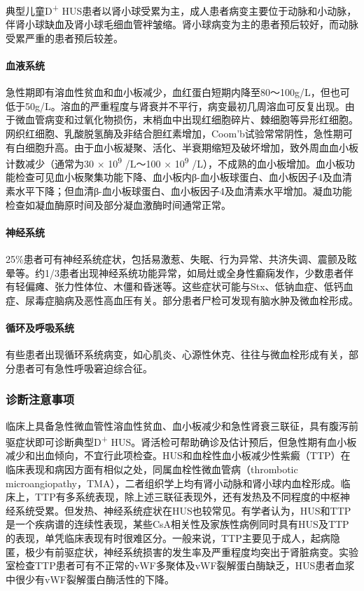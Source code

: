 典型儿童D\textsuperscript{+}
HUS患者以肾小球受累为主，成人患者病变主要位于动脉和小动脉，伴肾小球缺血及肾小球毛细血管袢皱缩。肾小球病变为主的患者预后较好，而动脉受累严重的患者预后较差。

\paragraph{血液系统}

急性期即有溶血性贫血和血小板减少，血红蛋白短期内降至80～100g/L，但也可低于50g/L。溶血的严重程度与肾衰并不平行，病变最初几周溶血可反复出现。由于微血管病变和过氧化物损伤，末梢血中出现红细胞碎片、棘细胞等异形红细胞。网织红细胞、乳酸脱氢酶及非结合胆红素增加，Coom'b试验常常阴性，急性期可有白细胞升高。由于血小板凝聚、活化、半衰期缩短及破坏增加，致外周血血小板计数减少（通常为30
× 10\textsuperscript{9} /L～100 × 10\textsuperscript{9}
/L），不成熟的血小板增加。血小板功能检查可见血小板聚集功能下降、血小板内β-血小板球蛋白、血小板因子4及血清素水平下降；但血清β-血小板球蛋白、血小板因子4及血清素水平增加。凝血功能检查如凝血酶原时间及部分凝血激酶时间通常正常。

\paragraph{神经系统}

25\%患者可有神经系统症状，包括易激惹、失眠、行为异常、共济失调、震颤及眩晕等。约1/3患者出现神经系统功能异常，如局灶或全身性癫痫发作，少数患者伴有轻偏瘫、张力性体位、木僵和昏迷等。这些症状可能与Stx、低钠血症、低钙血症、尿毒症脑病及恶性高血压有关。部分患者尸检可发现有脑水肿及微血栓形成。

\paragraph{循环及呼吸系统}

有些患者出现循环系统病变，如心肌炎、心源性休克、往往与微血栓形成有关，部分患者可有急性呼吸窘迫综合征。

\subsubsection{诊断注意事项}

临床上具备急性微血管性溶血性贫血、血小板减少和急性肾衰三联征，具有腹泻前驱症状即可诊断典型D\textsuperscript{+}
HUS。肾活检可帮助确诊及估计预后，但急性期有血小板减少和出血倾向，不宜行此项检查。HUS和血栓性血小板减少性紫癜（TTP）在临床表现和病因方面有相似之处，同属血栓性微血管病（thrombotic
microangiopathy，TMA），二者组织学上均有肾小动脉和肾小球内血栓形成。临床上，TTP有多系统表现，除上述三联征表现外，还有发热及不同程度的中枢神经系统受累。但发热、神经系统症状在HUS也较常见。有学者认为，HUS和TTP是一个疾病谱的连续性表现，某些CsA相关性及家族性病例同时具有HUS及TTP的表现，单凭临床表现有时很难区分。一般来说，TTP主要见于成人，起病隐匿，极少有前驱症状，神经系统损害的发生率及严重程度均突出于肾脏病变。实验室检查TTP患者可有不正常的vWF多聚体及vWF裂解蛋白酶缺乏，HUS患者血浆中很少有vWF裂解蛋白酶活性的下降。

